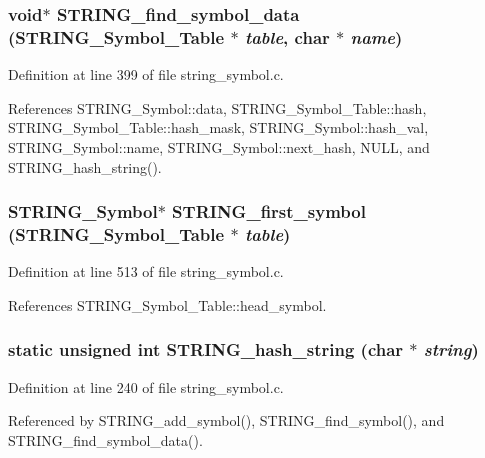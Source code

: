 \subsubsection{\setlength{\rightskip}{0pt plus 5cm}void$\ast$ STRING\_\-find\_\-symbol\_\-data (\bf{STRING\_\-Symbol\_\-Table} $\ast$ {\em table}, char $\ast$ {\em name})}\label{string__symbol_8c_da0f492911e7e3f00b09b45442a17637}




Definition at line 399 of file string\_\-symbol.c.

References STRING\_\-Symbol::data, STRING\_\-Symbol\_\-Table::hash, STRING\_\-Symbol\_\-Table::hash\_\-mask, STRING\_\-Symbol::hash\_\-val, STRING\_\-Symbol::name, STRING\_\-Symbol::next\_\-hash, NULL, and STRING\_\-hash\_\-string().
\subsubsection{\setlength{\rightskip}{0pt plus 5cm}\bf{STRING\_\-Symbol}$\ast$ STRING\_\-first\_\-symbol (\bf{STRING\_\-Symbol\_\-Table} $\ast$ {\em table})}\label{string__symbol_8c_a2ef83df4d6c2cfabf3d13d63970987e}




Definition at line 513 of file string\_\-symbol.c.

References STRING\_\-Symbol\_\-Table::head\_\-symbol.
\subsubsection{\setlength{\rightskip}{0pt plus 5cm}static unsigned int STRING\_\-hash\_\-string (char $\ast$ {\em string})\hspace{0.3cm}{\tt  [static]}}\label{string__symbol_8c_e5ce7f2c7eb79b2c18c3a3595b1d023f}




Definition at line 240 of file string\_\-symbol.c.

Referenced by STRING\_\-add\_\-symbol(), STRING\_\-find\_\-symbol(), and STRING\_\-find\_\-symbol\_\-data().
